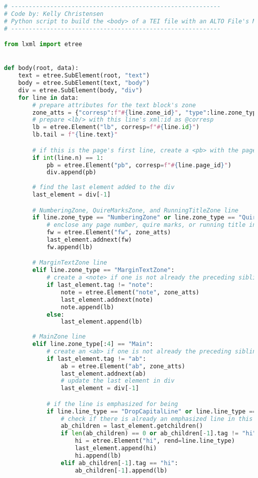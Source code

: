 \documentclass[class=article, crop=false]{standalone}
\begin{document}
\begin{lstlisting}[language=python, style=python]
# -----------------------------------------------------------
# Code by: Kelly Christensen
# Python script to build the <body> of a TEI file with an ALTO File's MainZone text.
# -----------------------------------------------------------

from lxml import etree


def body(root, data):
    text = etree.SubElement(root, "text")
    body = etree.SubElement(text, "body")
    div = etree.SubElement(body, "div")
    for line in data:
        # prepare attributes for the text block's zone
        zone_atts = {"corresp":f"#{line.zone_id}", "type":line.zone_type}
        # prepare <lb/> with this line's xml:id as @corresp
        lb = etree.Element("lb", corresp=f"#{line.id}")
        lb.tail = f"{line.text}"

        # if this is the page's first line, create a <pb> with the page's xml:id
        if int(line.n) == 1:
            pb = etree.Element("pb", corresp=f"#{line.page_id}")
            div.append(pb)
        
        # find the last element added to the div
        last_element = div[-1]

        # NumberingZone, QuireMarksZone, and RunningTitleZone line
        if line.zone_type == "NumberingZone" or line.zone_type == "QuireMarksZone" or line.zone_type == "RunningTitleZone":
            # enclose any page number, quire marks, or running title inside a <fw>
            fw = etree.Element("fw", zone_atts)
            last_element.addnext(fw)
            fw.append(lb)

        # MarginTextZone line
        elif line.zone_type == "MarginTextZone":
            # create a <note> if one is not already the preceding sibling
            if last_element.tag != "note":
                note = etree.Element("note", zone_atts)
                last_element.addnext(note)
                note.append(lb)
            else:
                last_element.append(lb)
            
        # MainZone line
        elif line.zone_type[:4] == "Main":
            # create an <ab> if one is not already the preceding sibling 
            if last_element.tag != "ab":
                ab = etree.Element("ab", zone_atts)
                last_element.addnext(ab)
                # update the last element in div
                last_element = div[-1]

            # if the line is emphasized for being 
            if line.line_type == "DropCapitalLine" or line.line_type == "HeadingLine":
                # check if there is already an emphasized line in this MainZone
                ab_children = last_element.getchildren()
                if len(ab_children) == 0 or ab_children[-1].tag != "hi" or ab_children[-1].get("rend") != line.line_type:
                    hi = etree.Element("hi", rend=line.line_type)
                    last_element.append(hi)
                    hi.append(lb)
                elif ab_children[-1].tag == "hi":
                    ab_children[-1].append(lb)
            

\end{lstlisting}
\end{document}

